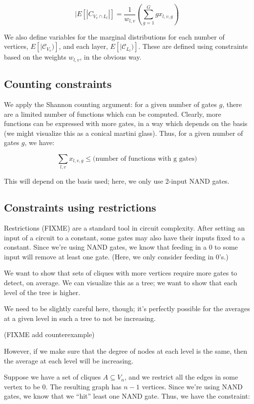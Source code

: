 \documentclass[12pt]{article}
\theoremstyle{definition}
\newcommand{\bigC}[0]{\mathcal{C}}
\begin{document}
\[
|E[|C_{V_v \cap L_l}|] = \frac{1}{w_{l,v}} \left( \sum_{g=1}^G g x_{l,v,g} \right)
\]

We also define variables for
the marginal distributions for each number of vertices, $E[|\bigC_{V_v})]$,
and each layer, $E[|\bigC_{L_l})]$. These are defined using constraints
based on the weights $w_{l,v}$, in the obvious way.

\subsection{Counting constraints}

We apply the Shannon counting argument: for a given number
of gates $g$, there are a limited number of functions which can be computed.
Clearly, more functions can be expressed with more gates, in a way
which depends on the basis (we might visualize this as a conical
martini glass). Thus, for a given number of gates $g$, we have:

\[
\sum_{l,v} x_{l,v,g} \le \text{(number of functions with g gates)}
\]

This will depend on the basis used; here, we only use 2-input
NAND gates.

\subsection{Constraints using restrictions}

Restrictions (FIXME) are a standard tool in circuit complexity.
After setting an input of a circuit to a constant, some gates
may also have their inputs fixed to a constant.
Since we're using NAND gates, we know that feeding in
a 0 to some input will remove at least one gate. (Here, we
only consider feeding in 0's.)

We want to show that sets of cliques with more vertices
require more gates to detect, on average. We can visualize this
as a tree; we want to show that each level of the tree is higher.

We need to be slightly careful here, though; it's perfectly possible
for the averages at a given level in such a tree to not be increasing.

(FIXME add counterexample)

However, if we make sure that the degree of nodes at each level
is the same, then the average at each level will be increasing.



Suppose we have a set of cliques $A \subseteq V_n$, and we restrict
all the edges in some vertex to be 0. The resulting graph has $n-1$ vertices.
Since we're using NAND gates, we know that we ``hit'' least one NAND gate.
Thus, we have the constraint:
\end{document}
